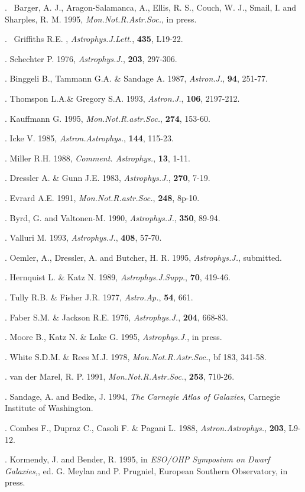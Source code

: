. \ Barger, A. J., Aragon-Salamanca, A., Ellis, R. S., Couch, W. J.,
Smail,
I. and Sharples, R. M. 1995, {\it Mon.Not.R.Astr.Soc.}, in press.

. \ Griffiths R.E. , {\it Astrophys.J.Lett.}, {\bf 435}, L19-22.

. Schechter P. 1976, {\it Astrophys.J.}, {\bf 203}, 297-306.

. Binggeli B., Tammann G.A. \& Sandage A. 1987, {\it Astron.J.}, {\bf
94}, 251-77.

. Thomspon L.A.\& Gregory S.A. 1993, {\it Astron.J.}, {\bf 106},
2197-212.

. Kauffmann G. 1995, {\it Mon.Not.R.astr.Soc.}, {\bf 274}, 153-60.

. Icke V. 1985, {\it Astron.Astrophys.}, {\bf 144}, 115-23.

. Miller R.H. 1988, {\it Comment. Astrophys.}, {\bf 13}, 1-11.

. Dressler A. \& Gunn J.E. 1983, {\it Astrophys.J.}, {\bf 270}, 7-19.

. Evrard A.E. 1991, {\it Mon.Not.R.astr.Soc.}, {\bf 248}, 8p-10.

. Byrd, G. and Valtonen-M. 1990, {\it Astrophys.J.}, {\bf 350}, 89-94.

. Valluri M. 1993, {\it Astrophys.J.}, {\bf 408}, 57-70.

. Oemler, A., Dressler, A. and Butcher, H. R. 1995,
{\it Astrophys.J.}, submitted.

. Hernquist L. \& Katz N. 1989, {\it Astrophys.J.Supp.}, {\bf 70},
419-46.

. Tully R.B. \& Fisher J.R. 1977, {\it Astro.Ap.}, {\bf 54}, 661.

. Faber S.M. \& Jackson R.E. 1976, {\it Astrophys.J.}, {\bf 204}, 668-83.

. Moore B., Katz N. \& Lake G. 1995, {\it Astrophys.J.}, in press.

. White S.D.M. \& Rees M.J. 1978, {\it Mon.Not.R.Astr.Soc.}, {bf 183},
341-58.


. van der Marel, R. P. 1991, {\it Mon.Not.R.Astr.Soc.}, {\bf 253},
710-26.

. Sandage, A. and Bedke, J. 1994, {\it The Carnegie Atlas of
Galaxies}, Carnegie Institute of Washington.

. Combes F., Dupraz C., Casoli F. \& Pagani L. 1988, {\it
Astron.Astrophys.},
{\bf 203}, L9-12.

. Kormendy, J. and Bender, R. 1995, in {\it ESO/OHP Symposium
on Dwarf Galaxies,}, ed. G. Meylan and P. Prugniel, European
Southern Observatory, in press.

